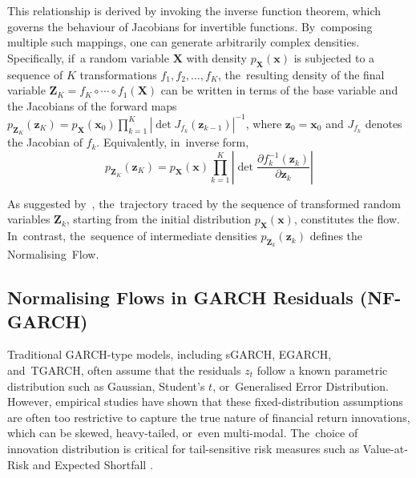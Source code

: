 \documentclass[risks,article,accept,pdftex,moreauthors]{Definitions/mdpi}
\begin{document}
This relationship is derived by invoking the inverse function theorem, which governs the behaviour of Jacobians for invertible functions. By~composing multiple such mappings, one can generate arbitrarily complex densities. Specifically, if~a random variable \(\mathbf{X}\) with density \(p_\mathbf{X}(\mathbf{x})\) is subjected to a sequence of \(K\) transformations \(f_1, f_2, \dots, f_K\), the~resulting density of the final variable \(\mathbf{Z}_K = f_K \circ \cdots \circ f_1(\mathbf{X})\) can be written in terms of the base variable and the Jacobians of the forward maps \(p_{\mathbf{Z}_K}(\mathbf{z}_K) = p_\mathbf{X}(\mathbf{x}_0) \prod_{k=1}^{K} \left|\det J_{f_k}(\mathbf{z}_{k-1})\right|^{-1}\), where \(\mathbf{z}_0 = \mathbf{x}_0\) and \(J_{f_k}\) denotes the Jacobian of \(f_k\). Equivalently, in~inverse form,
\begin{equation}
p_{\mathbf{Z}_K}(\mathbf{z}_K) = p_\mathbf{X}(\mathbf{x}) \prod_{k=1}^{K} \left|\det \frac{\partial f_k^{-1}(\mathbf{z}_k)}{\partial \mathbf{z}_k}\right|
\end{equation}


As suggested by~\cite{kobyzev2020normalising}, the~trajectory traced by the sequence of transformed random variables \(\mathbf{Z}_k\), starting from the initial distribution \(p_\mathbf{X}(\mathbf{x})\), constitutes the flow. In~contrast, the~sequence of intermediate densities \(p_{\mathbf{Z}_k}(\mathbf{z}_k)\) defines the \mbox{Normalising~Flow.}


\subsection{Normalising Flows in GARCH Residuals (NF-GARCH)}
 
Traditional GARCH-type models, including sGARCH, EGARCH, and~TGARCH, often assume that the residuals \( z_t \) follow a known parametric distribution such as Gaussian, Student's \( t \), or~Generalised Error Distribution. However, empirical studies have shown that these fixed-distribution assumptions are often too restrictive to capture the true nature of financial return innovations, which can be skewed, heavy-tailed, or~even multi-modal. The~choice of innovation distribution is critical for tail-sensitive risk measures such as Value-at-Risk and Expected Shortfall \citep{hansen1994autoregressive, bauwens2006multivariate}.
\end{document}
